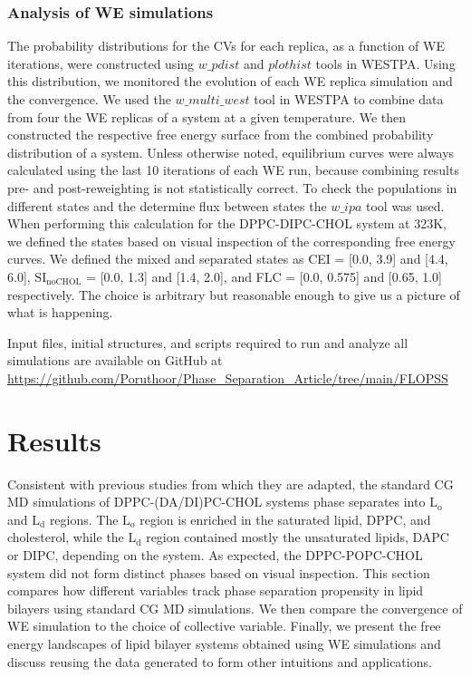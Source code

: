 \documentclass{biophys-new}
\begin{document}
\subsubsection*{Analysis of WE simulations}
The probability distributions for the CVs for each replica, as a function of WE iterations, were constructed using $w\_pdist$ and $plothist$ tools in WESTPA.
Using this distribution, we monitored the evolution of each WE replica simulation and the convergence.
We used the $w\_multi\_west$ tool in WESTPA to combine data from four the WE replicas of a system at a given temperature.
We then constructed the respective free energy surface from the combined probability distribution of a system. Unless otherwise noted, equilibrium curves were always calculated using the last 10 iterations of each WE run, because combining results pre- and post-reweighting is not statistically correct.
To check the populations in different states and the determine flux between states the $w\_ipa$ tool was used.
When performing this calculation for the DPPC-DIPC-CHOL system at 323K, we defined the states based on visual inspection of the corresponding free energy curves. We defined the mixed and separated states as CEI = [0.0, 3.9] and [4.4, 6.0], $\text{SI}_{\text{noCHOL}}$ = [0.0, 1.3] and [1.4, 2.0], and FLC = [0.0, 0.575] and [0.65, 1.0] respectively.
The choice is arbitrary but reasonable enough to give us a picture of what is happening.

Input files, initial structures, and scripts required to run and analyze all simulations are available on GitHub at \href{https://github.com/Poruthoor/Phase\_Separation\_Article/tree/main/FLOPSS}{https://github.com/Poruthoor/Phase\_Separation\_Article/tree/main/FLOPSS}

\section*{Results}

Consistent with previous studies from which they are adapted, the standard CG MD simulations of DPPC-(DA/DI)PC-CHOL systems phase separates into $\text{L}_{\text{o}}$ and $\text{L}_{\text{d}}$ regions.
The $\text{L}_{\text{o}}$ region is enriched in the saturated lipid, DPPC, and cholesterol, while the
$\text{L}_{\text{d}}$ region contained mostly the unsaturated lipids, DAPC or DIPC, depending on the system.
As expected, the DPPC-POPC-CHOL system did not form distinct phases based on visual inspection.
This section compares how different variables track phase separation propensity in lipid bilayers using standard CG MD simulations.
We then compare the convergence of WE simulation to the choice of collective variable.
Finally, we present the free energy landscapes of lipid bilayer systems obtained using WE simulations and discuss reusing the data generated to form other intuitions and applications.
\end{document}

